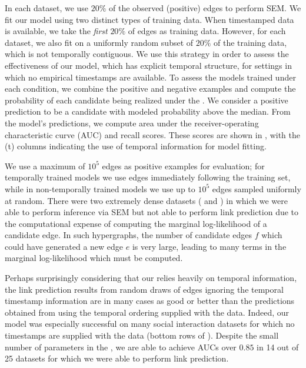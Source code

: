 In each dataset, we use $20\%$ of the observed (positive) edges to perform SEM. 
We fit our model using two distinct types of training data. 
When timestamped data is available, we take the \emph{first} $20\%$ of edges as training data. 
However, for each dataset, we also fit on a uniformly random subset of $20\%$ of the training data, which is not temporally contiguous. 
We use this strategy in order to assess the effectiveness of our model, which has explicit temporal structure, for settings in which no empirical timestamps are available. 
To assess the models trained under each condition, we combine the positive and negative examples and compute the probability of each candidate being realized under the \model. 
We consider a positive prediction to be a candidate with modeled probability above the median. 
From the model's predictions, we compute area under the receiver-operating characteristic curve (AUC) and recall scores. 
These scores are shown in , with the (t) columns indicating the use of temporal information for model fitting. 

We use a maximum of $10^5$ edges as positive examples for evaluation; for temporally trained models we use edges immediately following the training set, while in non-temporally trained models we use up to $10^5$ edges sampled uniformly at random. 
There were two extremely dense datasets ( and ) in which we were able to perform inference via SEM but not able to perform link prediction due to the computational expense of computing the marginal log-likelihood of a candidate edge. 
In such hypergraphs, the number of candidate edges $f$ which could have generated a new edge $e$ is very large, leading to many terms in the marginal log-likelihood which must be computed. 

Perhaps surprisingly considering that our \model relies heavily on temporal information, the link prediction results from random draws of edges ignoring the temporal timestamp information are in many cases as good or better than the predictions obtained from using the temporal ordering supplied with the data. 
Indeed, our model was especially successful on many social interaction datasets for which no timestamps are supplied with the data (bottom rows of ). 
Despite the small number of parameters in the \model, we are able to achieve AUCs over $0.85$ in 14 out of 25 datasets for which we were able to perform link prediction. 




